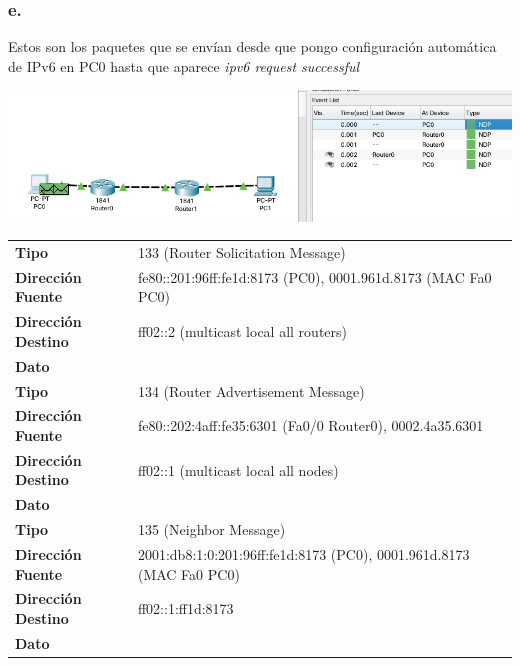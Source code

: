 \documentclass[11pt]{article}
\begin{document}
\subsubsection*{e.}
\label{sec:org21e519d}
Estos son los paquetes que se envían desde que pongo configuración automática de IPv6 en PC0 hasta que aparece \emph{ipv6 request successful}
\begin{center}
\includegraphics[width=.9\linewidth]{./4f.png}
\end{center}
\begin{center}
\begin{tabular}{ll}
\hline
\textbf{Tipo} & 133 (Router Solicitation Message)\\
\textbf{Dirección Fuente} & fe80::201:96ff:fe1d:8173 (PC0), 0001.961d.8173 (MAC Fa0 PC0)\\
\textbf{Dirección Destino} & ff02::2 (multicast local all routers)\\
\textbf{Dato} & \\
\hline
\textbf{Tipo} & 134 (Router Advertisement Message)\\
\textbf{Dirección Fuente} & fe80::202:4aff:fe35:6301 (Fa0/0 Router0), 0002.4a35.6301\\
\textbf{Dirección Destino} & ff02::1 (multicast local all nodes)\\
\textbf{Dato} & \\
\hline
\textbf{Tipo} & 135 (Neighbor Message)\\
\textbf{Dirección Fuente} & 2001:db8:1:0:201:96ff:fe1d:8173 (PC0), 0001.961d.8173 (MAC Fa0 PC0)\\
\textbf{Dirección Destino} & ff02::1:ff1d:8173\\
\textbf{Dato} & \\
\hline
\end{tabular}
\end{center}
\end{document}
